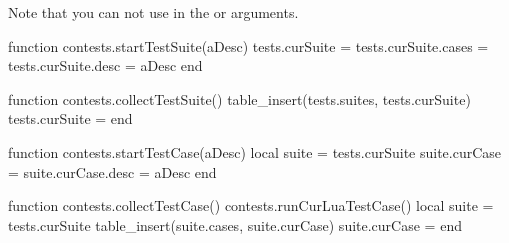 
\startchapter[title=Unit Test Suites]

Note that you can not use  in the \type{\startTestSuite} or 
\type{\startTestCase} arguments. 

\startMkIVCode

\def\startTestSuite[#1]{%
  \startsubsection[title=Test Suite: #1]
  \directlua{thirddata.contests.startTestSuite("#1")}
}

\def\stopTestSuite{%
  \stopsubsection%
  \directlua{thirddata.contests.collectTestSuite()}
}

\def\startTestCase[#1]{%
  \startsubsubsection[title=Test Case: #1]
  \directlua{thirddata.contests.startTestCase("#1")}
}

\def\stopTestCase{%
  \stopsubsubsection%
  \directlua{thirddata.contests.collectTestCase()}
}

\stopMkIVCode

\startLuaCode

function contests.startTestSuite(aDesc)
  tests.curSuite       = {}
  tests.curSuite.cases = {}
  tests.curSuite.desc  = aDesc
end

function contests.collectTestSuite()
  table_insert(tests.suites, tests.curSuite)
  tests.curSuite = {}
end

function contests.startTestCase(aDesc)
  local suite = tests.curSuite
  suite.curCase = {}
  suite.curCase.desc = aDesc
end

function contests.collectTestCase()
  contests.runCurLuaTestCase()
  local suite = tests.curSuite
  table_insert(suite.cases, suite.curCase)
  suite.curCase = {}
end

\stopLuaCode

\stopchapter